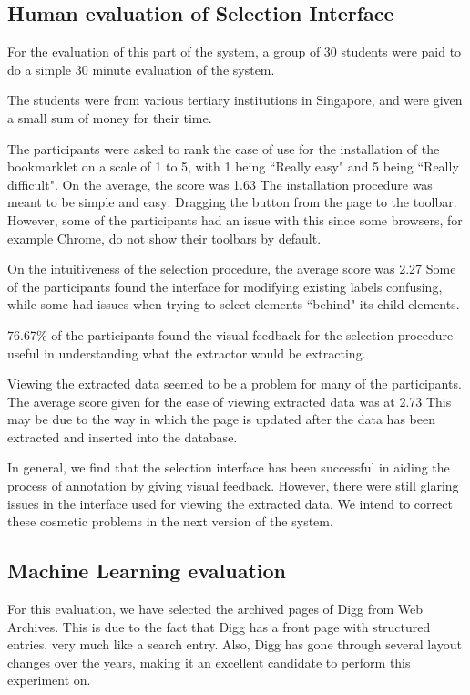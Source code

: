 \documentclass[a4paper,12pt]{nurop}
\begin{document}
\subsection{Human evaluation of Selection Interface}
For the evaluation of this part of the system, a group of 30 students were paid to do a simple 30
minute evaluation of the system.

The students were from various tertiary institutions in Singapore, and were given a small sum of
money for their time.

The participants were asked to rank the ease of use for the installation of the bookmarklet on
a scale of 1 to 5, with 1 being ``Really easy" and 5 being ``Really difficult".
 On the average, the score was 1.63 The installation procedure was meant to
be simple and easy: Dragging the button from the page to the toolbar. However, some of the 
participants had an issue with this since some browsers, for example Chrome, do not show their
toolbars by default. 

On the intuitiveness of the selection procedure, the average score was 2.27
Some of the participants found the interface for modifying existing labels confusing,
while some had issues when trying to select elements ``behind" its child elements.

76.67\% of the participants found the visual feedback for the selection procedure useful
in understanding what the extractor would be extracting. 

Viewing the extracted data seemed to be a problem for many of the participants. The average
score given for the ease of viewing extracted data was at 2.73 This may be due to the way
in which the page is updated after the data has been extracted and inserted into the database.


In general, we find that the selection interface has been successful in aiding
the process of annotation by giving visual feedback. However, there were still
glaring issues in the interface used for viewing the extracted data. We intend to
correct these cosmetic problems in the next version of the system.

\subsection{Machine Learning evaluation}
For this evaluation, we have selected the archived pages of Digg from Web Archives. This is
 due to the fact that Digg has a front page with structured entries, very much like a search
 entry. Also, Digg has gone through several layout changes over the years, making it an excellent
 candidate to perform this experiment on.
\end{document}
